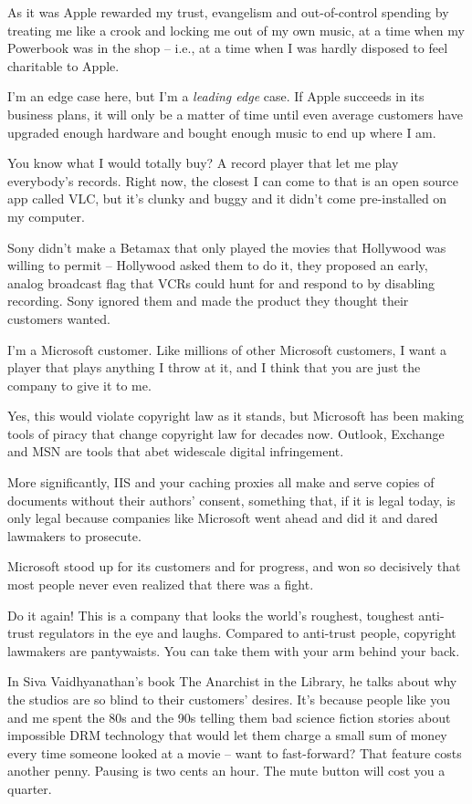 As it was Apple rewarded my trust, evangelism and out-of-control
spending by treating me like a crook and locking me out of my own
music, at a time when my Powerbook was in the shop -- i.e., at a
time when I was hardly disposed to feel charitable to Apple.

I'm an edge case here, but I'm a \emph{leading edge} case. If
Apple succeeds in its business plans, it will only be a matter of
time until even average customers have upgraded enough hardware and
bought enough music to end up where I am.

You know what I would totally buy? A record player that let me play
everybody's records. Right now, the closest I can come to that is
an open source app called VLC, but it's clunky and buggy and it
didn't come pre-installed on my computer.

Sony didn't make a Betamax that only played the movies that
Hollywood was willing to permit -- Hollywood asked them to do it,
they proposed an early, analog broadcast flag that VCRs could hunt
for and respond to by disabling recording. Sony ignored them and
made the product they thought their customers wanted.

I'm a Microsoft customer. Like millions of other Microsoft
customers, I want a player that plays anything I throw at it, and I
think that you are just the company to give it to me.

Yes, this would violate copyright law as it stands, but Microsoft
has been making tools of piracy that change copyright law for
decades now. Outlook, Exchange and MSN are tools that abet
widescale digital infringement.

More significantly, IIS and your caching proxies all make and serve
copies of documents without their authors' consent, something that,
if it is legal today, is only legal because companies like
Microsoft went ahead and did it and dared lawmakers to prosecute.

Microsoft stood up for its customers and for progress, and won so
decisively that most people never even realized that there was a
fight.

Do it again! This is a company that looks the world's roughest,
toughest anti-trust regulators in the eye and laughs. Compared to
anti-trust people, copyright lawmakers are pantywaists. You can
take them with your arm behind your back.

In Siva Vaidhyanathan's book The Anarchist in the Library, he talks
about why the studios are so blind to their customers' desires.
It's because people like you and me spent the 80s and the 90s
telling them bad science fiction stories about impossible DRM
technology that would let them charge a small sum of money every
time someone looked at a movie -- want to fast-forward? That
feature costs another penny. Pausing is two cents an hour. The mute
button will cost you a quarter.

